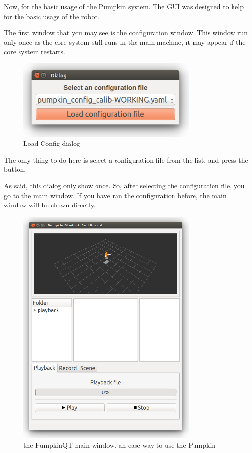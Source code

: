\documentclass[oneside,a4paper,titlepage]{article}
\begin{document}
Now, for the basic usage of the Pumpkin system. The GUI was designed to help for the basic usage of the robot.

The first window that you may see is the configuration window. This window run only once as the core system still runs in the main machine, it may appear if the core system restarts.

\begin{figure}[ht!]
	\centering
	\includegraphics[width=0.8\textwidth]{load_config}
	\caption{Load Config dialog}
	\label{fig:load_config}
\end{figure}

The only thing to do here is select a configuration file from the list, and press the button.

As said, this dialog only show once. So, after selecting the configuration file, you go to the main window. If you have ran the configuration before, the main window will be shown directly.

\begin{figure}[ht!]
	\centering
	\includegraphics[width=0.8\textwidth]{main_window}
	\caption[Main Window]{the PumpkinQT main window, an ease way to use the Pumpkin}
	\label{fig:main_window}
\end{figure}
\end{document}

